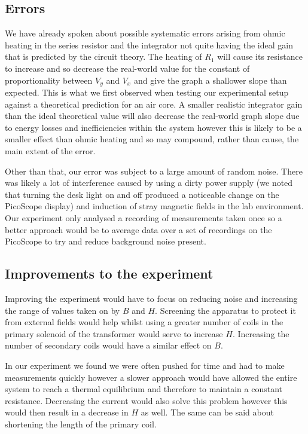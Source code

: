 \documentclass[12pt]{article}
\begin{document}
\subsection{Errors}
We have already spoken about possible systematic errors arising from ohmic heating in the series resistor and the integrator not quite having the ideal gain that is predicted by the circuit theory. The heating of $R_1$ will cause its resistance to increase and so decrease the real-world value for the constant of proportionality between $V_y$ and $V_x$ and give the graph a shallower slope than expected. This is what we first observed when testing our experimental setup against a theoretical prediction for an air core. A smaller realistic integrator gain than the ideal theoretical value will also decrease the real-world graph slope due to energy losses and inefficiencies within the system however this is likely to be a smaller effect than ohmic heating and so may compound, rather than cause, the main extent of the error.

Other than that, our error was subject to a large amount of random noise. There was likely a lot of interference caused by using a dirty power supply (we noted that turning the desk light on and off produced a noticeable change on the PicoScope display) and induction of stray magnetic fields in the lab environment. Our experiment only analysed a recording of measurements taken once so a better approach would be to average data over a set of recordings on the PicoScope to try and reduce background noise present.




\subsection{Improvements to the experiment}
Improving the experiment would have to focus on reducing noise and increasing the range of values taken on by $B$ and $H$. Screening the apparatus to protect it from external fields would help whilst using a greater number of coils in the primary solenoid of the transformer would serve to increase $H$. Increasing the number of secondary coils would have a similar effect on $B$.

In our experiment we found we were often pushed for time and had to make measurements quickly however a slower approach would have allowed the entire system to reach a thermal equilibrium and therefore to maintain a constant resistance. Decreasing the current would also solve this problem however this would then result in a decrease in $H$ as well. The same can be said about shortening the length of the primary coil.
\end{document}
